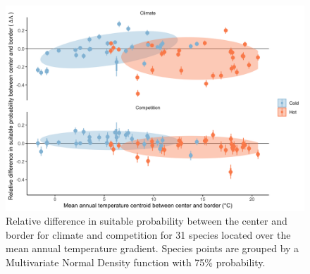 \hypertarget{fig:figsupp4}{%
\begin{figure}
\centering
\includegraphics{manuscript/figs/fig-sp_diff_over_MAT-1.png}
\caption[{Relative difference in suitable probability between the center
and border for climate and competition for 31 species located over the
mean annual temperature gradient.}]{Relative difference in suitable
probability between the center and border for climate and competition
for 31 species located over the mean annual temperature gradient.
Species points are grouped by a Multivariate Normal Density function
with 75\% probability.}
\label{fig:figsupp4}
\end{figure}
}

\newpage

